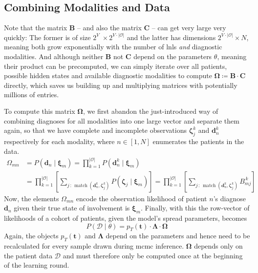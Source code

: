 \documentclass[\relativeRoot/main.tex]{subfiles}
\begin{document}
\subsection{Combining Modalities and Data}
\label{subsec:unilateral:formalism:combine}

Note that the matrix $\mathbf{B}$ -- and also the matrix $\mathbf{C}$ -- can get very large very quickly: The former is of size $2^V \!\!\!\; \times 2^{V\cdot|\mathcal{O}|}$ and the latter has dimensions $2^{V\cdot|\mathcal{O}|} \times N$, meaning both grow exponentially with the number of \glspl{lnl} \emph{and} diagnostic modalities. And although neither $\mathbf{B}$ not $\mathbf{C}$ depend on the parameters $\theta$, meaning their product can be precomputed, we can simply iterate over all patients, possible hidden states and available diagnostic modalities to compute $\boldsymbol{\Omega} \coloneqq \mathbf{B} \cdot \mathbf{C}$ directly, which saves us building up and multiplying matrices with potentially millions of entries.

To compute this matrix $\boldsymbol{\Omega}$, we first abandon the just-introduced way of combining diagnoses for all modalities into one large vector and separate them again, so that we have complete and incomplete observations $\boldsymbol{\zeta}_j^k$ and $\mathbf{d}_n^k$ respectively for each modality, where $n \in [1,N]$ enumerates the patients in the data.
%
\begin{equation}
    \begin{aligned}
        \Omega_{mn} 
        &= P \left( \mathbf{d}_n \mid \boldsymbol{\xi}_m  \right)
        = \prod_{k=1}^{|\mathcal{O}|}{ P \left( \mathbf{d}_n^k \mid \boldsymbol{\xi}_m \right) } \\
        &=  \prod_{k=1}^{|\mathcal{O}|}{ \left[ \sum_{j \,:\, \operatorname{match}(\mathbf{d}_n^k, \boldsymbol{\zeta}_j^k) }{ P \left( \boldsymbol{\zeta}_j \mid \boldsymbol{\xi}_m \right)} \right] }
        = \prod_{k=1}^{|\mathcal{O}|}{ \left[ \sum_{j \,:\, \operatorname{match}(\mathbf{d}_n^k, \boldsymbol{\zeta}_j^k) }{B_{mj}^{\,k}} \right] }
    \end{aligned}
\end{equation}
%
Now, the elements $\Omega_{mn}$ encode the observation likelihood of patient $n$'s diagnose $\mathbf{d}_n$ given their true state of involvement is $\boldsymbol{\xi}_m$. Finally, with this the row-vector of likelihoods of a cohort of patients, given the model's spread parameters, becomes
%
\begin{equation}
    P \left( \boldsymbol{\mathcal{D}} \mid \theta \right) = p_T\left( \mathbf{t} \right) \cdot \boldsymbol{\Lambda} \cdot \boldsymbol{\Omega}
\end{equation}
%
Again, the objects $p_T(\mathbf{t})$ and $\boldsymbol{\Lambda}$ depend on the parameters and hence need to be recalculated for every sample drawn during \gls{mcmc} inference. $\boldsymbol{\Omega}$ depends only on the patient data $\mathcal{D}$ and must therefore only be computed once at the beginning of the learning round.
\end{document}
